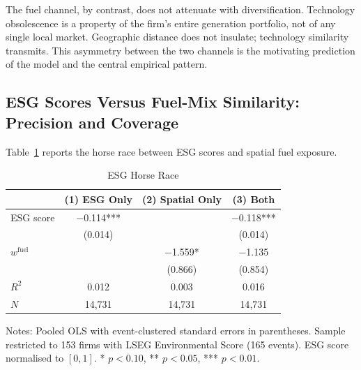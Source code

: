 \documentclass[12pt,a4paper]{article}
\begin{document}
The fuel channel, by contrast, does not attenuate with diversification. Technology obsolescence is a property of the firm's entire generation portfolio, not of any single local market. Geographic distance does not insulate; technology similarity transmits. This asymmetry between the two channels is the motivating prediction of the model and the central empirical pattern.


\subsection{ESG Scores Versus Fuel-Mix Similarity: Precision and Coverage}\label{sec:esg}

Table~\ref{tab:esg_horserace} reports the horse race between ESG scores and spatial fuel exposure.

\begin{table}[H]
\centering
\caption{ESG Horse Race}
\label{tab:esg_horserace}
\begin{tabular}{lccc}
\toprule
 & (1) ESG Only & (2) Spatial Only & (3) Both \\
\midrule
ESG score & $-$0.114*** & & $-$0.118*** \\
 & (0.014) & & (0.014) \\[4pt]
$w^{\text{fuel}}$ & & $-$1.559* & $-$1.135 \\
 & & (0.866) & (0.854) \\[4pt]
\midrule
$R^2$ & 0.012 & 0.003 & 0.016 \\
$N$ & 14{,}731 & 14{,}731 & 14{,}731 \\
\bottomrule
\end{tabular}
\begin{flushleft}\footnotesize
Notes: Pooled OLS with event-clustered standard errors in parentheses. Sample restricted to 153 firms with LSEG Environmental Score (165 events). ESG score normalised to $[0,1]$. * $p<0.10$, ** $p<0.05$, *** $p<0.01$.
\end{flushleft}
\end{table}
\end{document}
